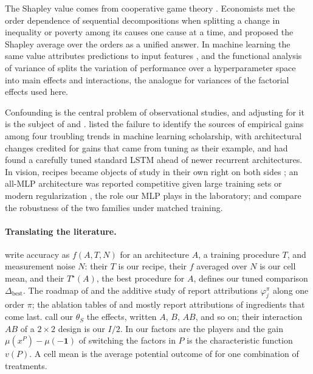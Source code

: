 \begin{refsection}
The Shapley value comes from cooperative game theory \parencite{Shapley1953}. Economists met the order dependence of sequential decompositions when splitting a change in inequality or poverty among its causes one cause at a time, and \textcite{Shorrocks2013} proposed the Shapley average over the orders as a unified answer. In machine learning the same value attributes predictions to input features \parencite{LundbergLee2017}, and the functional analysis of variance of \textcite{HutterHoosLeytonBrown2014} splits the variation of performance over a hyperparameter space into main effects and interactions, the analogue for variances of the factorial effects used here.

Confounding is the central problem of observational studies, and adjusting for it is the subject of \textcite{Pearl2009} and \textcite{ImbensRubin2015}. \Textcite{LiptonSteinhardt2019} listed the failure to identify the sources of empirical gains among four troubling trends in machine learning scholarship, with architectural changes credited for gains that came from tuning as their example, and \textcite{MelisDyerBlunsom2018} had found a carefully tuned standard LSTM ahead of newer recurrent architectures. In vision, recipes became objects of study in their own right on both sides \parencite{HeEtAl2019,WightmanTouvronJegou2021,BelloEtAl2021,SteinerEtAl2022,BeyerZhaiKolesnikov2022}; an all-MLP architecture was reported competitive given large training sets or modern regularization \parencite{TolstikhinEtAl2021}, the role our MLP plays in the laboratory; and \textcite{BaiEtAl2021} compare the robustness of the two families under matched training.

\paragraph{Translating the literature.} \Textcite{WightmanTouvronJegou2021} write accuracy as $f(A,T,N)$ for an architecture $A$, a training procedure $T$, and measurement noise $N$: their $T$ is our recipe, their $f$ averaged over $N$ is our cell mean, and their $T^\star(A)$, the best procedure for $A$, defines our tuned comparison $\Delta_{\mathrm{best}}$. The roadmap of \textcite{LiuEtAl2022} and the additive study of \textcite{BelloEtAl2021} report attributions $\varphi^\pi_j$ along one order $\pi$; the ablation tables of \textcite{TouvronEtAl2021} and \textcite{BeyerZhaiKolesnikov2022} mostly report attributions of ingredients that come last. \Textcite{BoxHunterHunter2005} call our $\theta_S$ the effects, written $A$, $B$, $AB$, and so on; their interaction $AB$ of a $2\times2$ design is our $I/2$. In \textcite{Shapley1953} our factors are the players and the gain $\mu(x^P)-\mu(-\mathbf 1)$ of switching the factors in $P$ is the characteristic function $v(P)$. A cell mean is the average potential outcome of \textcite{ImbensRubin2015} for one combination of treatments.

\printchapterbib
\end{refsection}
